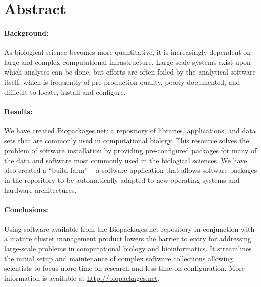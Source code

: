 



\section{Abstract}

\paragraph*{Background:}
As biological science becomes more quantitative, it is increasingly dependent on large and
complex computational infrastructure.  Large-scale systems exist upon which 
analyses can be done, but efforts are often foiled by the analytical software itself,
which is frequently of pre-production quality, poorly documented, and difficult to locate, install and configure.

\paragraph*{Results:}
We have created Biopackages.net: a repository of libraries, applications, and data sets
that are commonly used in computational biology. This resource solves the problem of software installation by providing pre-configured packages for many of the data and software most commonly used in the biological sciences.  We have also created a ``build farm''
-- a software application that allows software packages in the repository to be automatically adapted to
new operating systems and hardware architectures.

\paragraph*{Conclusions:}
Using software available from the Biopackages.net repository in conjunction with a
mature cluster management product lowers the barrier to entry for addressing
large-scale problems in computational biology and bioinformatics.  It streamlines the initial setup and maintenance of complex software collections allowing scientists to focus more time on research and less time on configuration.  More information is available at \url{http://biopackages.net}.

